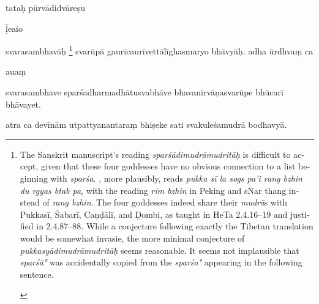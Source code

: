 \documentclass[naipra.tex]{subfiles}
\begin{document}
\begin{sanskrit}
\pstart
tataḥ pūrvādidvāreṣu \begin{mantra}ḹ\dsh e\dsh ai\dsh o\end{mantra}\dsh svarasambhavāḥ \footnote{
	\begin{english}%
		The Sanskrit manuscript's reading \emph{sparśādimudrāmudritāḥ} is difficult to accept, given that these four goddesses have no obvious connection to a list beginning with \emph{sparśa}.
		\TIB , more plausibly, reads \emph{pukka sī la sogs pa'i rang bzhin du rgyas btab pa}, with the reading \emph{rim bzhin} in Peking and sNar thang instead of \emph{rang bzhin}.
		The four goddesses indeed share their \emph{mudrā}s with Pukkasī, Śabarī, Caṇḍālī, and Ḍombi, as taught in HeTa 2.4.16–19 and justified in 2.4.87–88.
		While a conjecture following exactly the Tibetan translation would be somewhat invasie, the more minimal conjecture of \emph{pukkasyādimudrāmudritāḥ} seems reasonable.
		It seems not implausible that \emph{sparśā°} was accidentally copied from the \emph{sparśa°} appearing in the following sentence.
	\end{english}
} svarūpā gaurīcaurīvettālīghasmaryo bhāvyāḥ. 
 adha ūrdhvaṃ ca  \begin{mantra}au\dsh aṃ\end{mantra}\dsh svarasambhave sparśadharmadhātusvabhāve bhavanirvāṇasvarūpe bhūcarī bhāvayet.
\pend


\pstart
atra ca devīnām utpattyanantaraṃ bhiṣeke sati svakuleśamudrā bodhavyā. 
\pend


\end{sanskrit}
\end{document}
